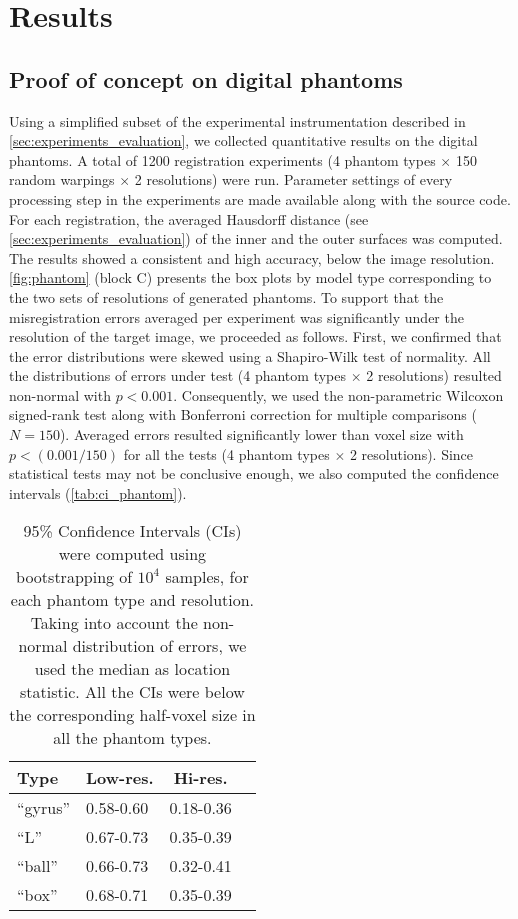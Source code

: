 \section{Results}
\label{sec:results}

\subsection{Proof of concept on digital phantoms}
\label{sec:results_phantom}
Using a simplified subset of the experimental instrumentation described in
  \autoref{sec:experiments_evaluation}, we collected quantitative results on the digital
  phantoms.
A total of 1200 registration experiments (4 phantom types $\times$ 150 random warpings
  $\times$ 2 resolutions) were run.
Parameter settings of every processing step in the experiments are made available along with
  the source code.
For each registration, the averaged Hausdorff distance (see \autoref{sec:experiments_evaluation})
  of the inner and the outer surfaces was computed.
The results showed a consistent and high accuracy, below the image resolution.
\autoref{fig:phantom} (block C) presents the box plots by model type corresponding
  to the two sets of resolutions of generated phantoms.
To support that the misregistration errors averaged per experiment was significantly
  under the resolution of the target image, we proceeded as follows.
First, we confirmed that the error distributions were skewed using a Shapiro-Wilk test of
  normality.
All the distributions of errors under test (4 phantom types $\times$ 2 resolutions) resulted
  non-normal with $p<0.001$.
Consequently, we used the non-parametric Wilcoxon signed-rank test along with Bonferroni
  correction for multiple comparisons ($N=150$).
Averaged errors resulted significantly lower than voxel size with $p < (0.001 / 150)$
  for all the tests (4 phantom types $\times$ 2 resolutions).
Since statistical tests may not be conclusive enough, we also computed the confidence intervals
  (\autoref{tab:ci_phantom}).


\begin{table}
		\centering
		\footnotesize
    \begin{tabular}{llcc}
    Type      & Low-res.  & Hi-res. \\
    \hline
    ``gyrus'' & 0.58-0.60 & 0.18-0.36 \\
    ``L''     & 0.67-0.73 & 0.35-0.39 \\
    ``ball''  & 0.66-0.73 & 0.32-0.41 \\
    ``box''   & 0.68-0.71 & 0.35-0.39 \\
    \hline
    \end{tabular}
    \caption{95\% Confidence Intervals (CIs) were computed using bootstrapping of $10^4$ samples,
      for each phantom type and resolution.
    Taking into account the non-normal distribution of errors, we used the median as location
  		statistic.
    All the CIs were below the corresponding half-voxel size in all the phantom types.}\label{tab:ci_phantom}
\end{table}

